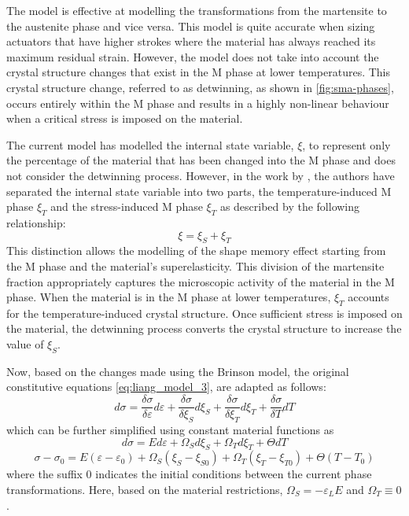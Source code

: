 The \cite{liangConstitutiveModelingShape1990a} model is effective at modelling the transformations from the martensite to the austenite phase and vice versa. This model is quite accurate when sizing actuators that have higher strokes where the material has always reached its maximum residual strain. However, the model does not take into account the crystal structure changes that exist in the M phase at lower temperatures. This crystal structure change, referred to as detwinning, as shown in \cref{fig:sma-phases}, occurs entirely within the M phase and results in a highly non-linear behaviour when a critical stress is imposed on the material.

The current model has modelled the internal state variable, $\xi$, to represent only the percentage of the material that has been changed into the M phase and does not consider the detwinning process. However, in the work by \cite{brinsonOneDimensionalConstitutiveBehavior1993}, the authors have separated the internal state variable into two parts, the temperature-induced M phase $\xi_T$ and the stress-induced M phase $\xi_T$ as described by the following relationship:
\begin{equation}
  \label{eq:xis-xit}
  \xi = \xi_S + \xi_T
\end{equation}
This distinction allows the modelling of the shape memory effect starting from the M phase and the material's superelasticity. This division of the martensite fraction appropriately captures the microscopic activity of the material in the M phase. When the material is in the M phase at lower temperatures, $\xi_T$ accounts for the temperature-induced crystal structure. Once sufficient stress is imposed on the material, the detwinning process converts the crystal structure to increase the value of $\xi_S$.

Now, based on the changes made using the Brinson model, the original constitutive equations \cref{eq:liang_model_3}, are adapted as follows:
\begin{equation}
  \label{eq:brinson_model_1}
  d\sigma = \frac{\delta\sigma}{\delta\varepsilon}d\varepsilon + \frac{\delta\sigma}{\delta\xi_S}d\xi_S + \frac{\delta\sigma}{\delta\xi_T}d\xi_T + \frac{\delta\sigma}{\delta T}dT
\end{equation}
 which can be further simplified using constant material functions as
\begin{equation}
  \label{eq:brinson_model_2}
  d\sigma = Ed\varepsilon + \Omega_Sd\xi_S + \Omega_Td\xi_T + \Theta dT
\end{equation}
\begin{equation}
  \label{eq:brinson_model_3}
  \sigma-\sigma_0 = E(\varepsilon-\varepsilon_0) + \Omega_S(\xi_S-\xi_{S0}) + \Omega_T(\xi_T-\xi_{T0}) + \Theta (T-T_0)
\end{equation}
where the suffix $0$ indicates the initial conditions between the current phase transformations. Here, based on the material restrictions, $\Omega_S=-\varepsilon_L E$ and $\Omega_T\equiv0$.

